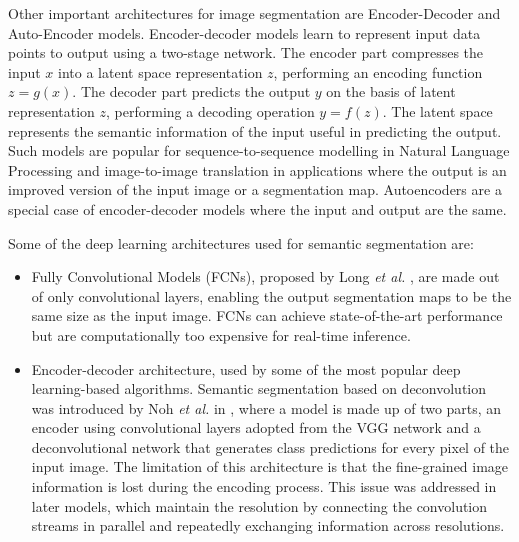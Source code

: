 \documentclass[a4paper,twoside,12pt]{book}
\begin{document}
Other important architectures for image segmentation are Encoder-Decoder and Auto-Encoder models. Encoder-decoder models learn to represent input data points to output using a two-stage network. The encoder part compresses the input $x$ into a latent space representation $z$, performing an encoding function $z = g(x)$. The decoder part predicts the output $y$ on the basis of latent representation $z$, performing a decoding operation $y = f(z)$. The latent space represents the semantic information of the input useful in predicting the output. Such models are popular for sequence-to-sequence modelling in Natural Language Processing and image-to-image translation in applications where the output is an improved version of the input image or a segmentation map. Autoencoders are a special case of encoder-decoder models where the input and output are the same.

Some of the deep learning architectures used for semantic segmentation are: %
\begin{itemize}
    \item Fully Convolutional Models (FCNs), proposed by Long \textit{et al.} \cite{long2015fully}, are made out of only convolutional layers, enabling the output segmentation maps to be the same size as the input image. FCNs can achieve state-of-the-art performance but are computationally too expensive for real-time inference.

    \item Encoder-decoder architecture, used by some of the most popular deep learning-based algorithms. Semantic segmentation based on deconvolution was introduced by Noh \textit{et al.} in \cite{noh2015learning}, where a model is made up of two parts, an encoder using convolutional layers adopted from the VGG network and a deconvolutional network that generates class predictions for every pixel of the input image. The limitation of this architecture is that the fine-grained image information is lost during the encoding process. This issue was addressed in later models, which maintain the resolution by connecting the convolution streams in parallel and repeatedly exchanging information across resolutions.
\end{itemize}


\end{document}
